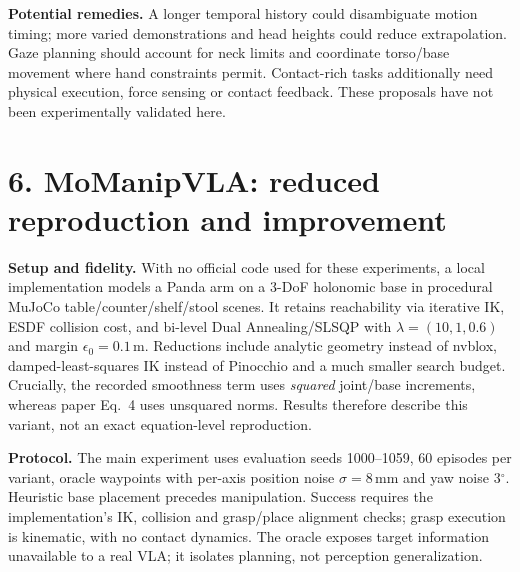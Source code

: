 \documentclass[10pt,a4paper]{article}
\begin{document}
\textbf{Potential remedies.} A longer temporal history could disambiguate motion timing; more varied demonstrations and head heights could reduce extrapolation. Gaze planning should account for neck limits and coordinate torso/base movement where hand constraints permit. Contact-rich tasks additionally need physical execution, force sensing or contact feedback. These proposals have not been experimentally validated here.

\clearpage
\section*{6. MoManipVLA: reduced reproduction and improvement}
\textbf{Setup and fidelity.} With no official code used for these experiments, a local implementation models a Panda arm on a 3-DoF holonomic base in procedural MuJoCo table/counter/shelf/stool scenes. It retains reachability via iterative IK, ESDF collision cost, and bi-level Dual Annealing/SLSQP with $\lambda=(10,1,0.6)$ and margin $\epsilon_0=0.1$\,m. Reductions include analytic geometry instead of nvblox, damped-least-squares IK instead of Pinocchio and a much smaller search budget. Crucially, the recorded smoothness term uses \emph{squared} joint/base increments, whereas paper Eq.~4 uses unsquared norms. Results therefore describe this variant, not an exact equation-level reproduction.

\textbf{Protocol.} The main experiment uses evaluation seeds 1000--1059, 60 episodes per variant, oracle waypoints with per-axis position noise $\sigma=8$\,mm and yaw noise 3$^\circ$. Heuristic base placement precedes manipulation. Success requires the implementation's IK, collision and grasp/place alignment checks; grasp execution is kinematic, with no contact dynamics. The oracle exposes target information unavailable to a real VLA; it isolates planning, not perception generalization.
\end{document}
